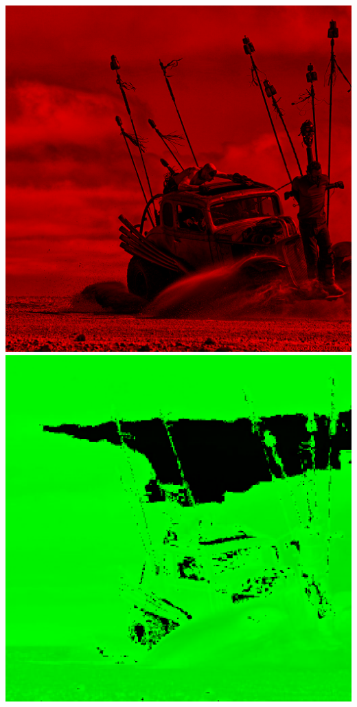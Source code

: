 \documentclass[a4paper,11pt]{article}
\begin{document}
\begin{center}
\includegraphics[scale=0.2]{./imgs/madmaxY2R.png}
\includegraphics[scale=0.2]{./imgs/madmaxY3G.png}

\end{center}
\end{document}

